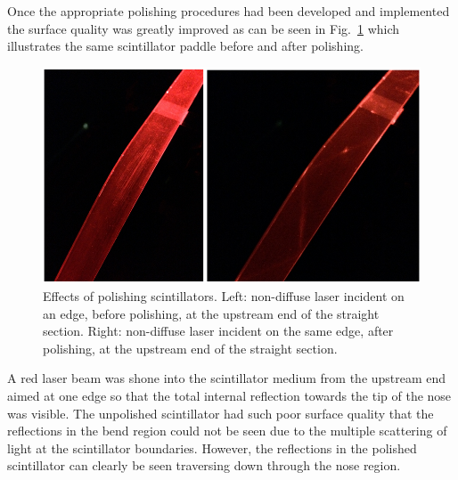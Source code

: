 Once the appropriate polishing procedures had been developed and implemented the surface quality was greatly improved as can be seen in Fig.~\ref{fig:polshing_effects} which illustrates the same scintillator paddle before and after polishing.
	\begin{figure}[!htb]
		\centering
		\includegraphics[width=1.0\columnwidth]{fabrication/figs/polshing_effects}
		\caption{Effects of polishing scintillators. Left: non-diffuse laser incident on an edge, before polishing, at the upstream end of the straight section. Right: non-diffuse laser incident on the same edge, after polishing, at the upstream end of the straight section.}
		\label{fig:polshing_effects}
	\end{figure}
A red laser beam was shone into the scintillator medium from the upstream end aimed at one edge so that the total internal reflection towards the tip of the nose was visible.  The unpolished scintillator had such poor surface quality that the reflections in the bend region could not be seen due to the multiple scattering of light at the scintillator boundaries.  However, the reflections in the polished scintillator can clearly be seen traversing down through the nose region.

